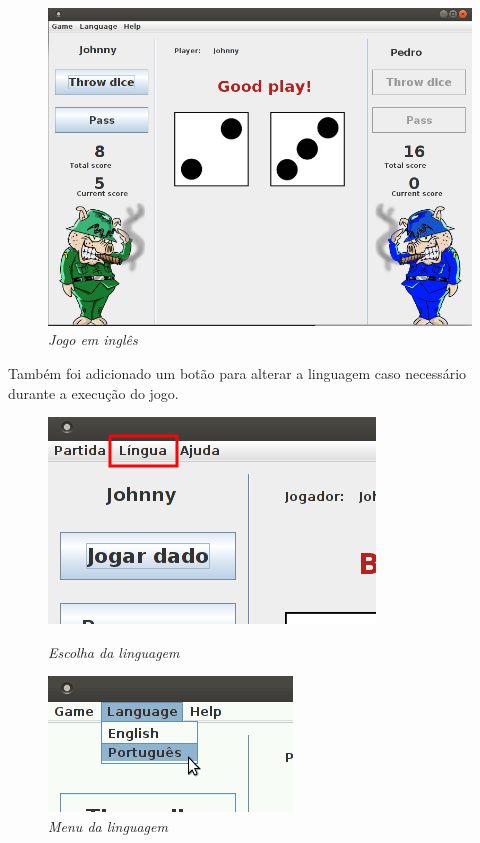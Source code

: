 \documentclass[a4paper, 12pt]{article}
\begin{document}
\begin{figure}[h!]
\centering
\includegraphics[width=\textwidth]{Screenshot-ingles.png}
\caption{\emph{Jogo em inglês}}
\end{figure}

\FloatBarrier
Também foi adicionado um botão para alterar a linguagem
caso necessário durante a execução do jogo.
\begin{figure}
\centering
\begin{minipage}{.5\textwidth}
\centering
\includegraphics[scale=0.4]{Screenshot-lingua.png}
\caption{\emph{Escolha da linguagem}}
\end{minipage}%
\begin{minipage}{.5\textwidth}
\centering
\includegraphics[scale=0.6]{Screenshot-menulingua.png}
\caption{\emph{Menu da linguagem}}
\end{minipage}
\end{figure}
\end{document}
